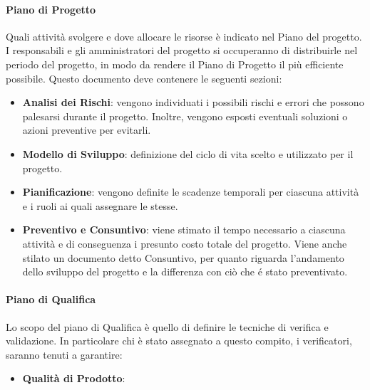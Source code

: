 \paragraph{Piano di Progetto}
Quali attività svolgere e dove allocare le risorse è indicato nel Piano del progetto. I responsabili e gli amministratori del progetto si occuperanno di distribuirle nel periodo del progetto, in modo da rendere il Piano di Progetto il più efficiente possibile. Questo documento deve contenere le seguenti sezioni:
\begin{itemize}
  \item \textbf{Analisi dei Rischi}: vengono individuati i possibili rischi e errori che possono palesarsi durante il progetto. Inoltre, vengono esposti eventuali soluzioni o azioni preventive per evitarli.
  \item \textbf{Modello di Sviluppo}: definizione del ciclo di vita scelto e utilizzato per il progetto.
  \item \textbf{Pianificazione}: vengono definite le scadenze temporali per ciascuna attività e i ruoli ai quali assegnare le stesse.
  \item \textbf{Preventivo e Consuntivo}: viene stimato il tempo necessario a ciascuna attività e di conseguenza i presunto costo totale del progetto. Viene anche stilato un documento detto Consuntivo, per quanto riguarda l'andamento dello sviluppo del progetto e la differenza con ciò che é stato preventivato.
\end{itemize}
\paragraph{Piano di Qualifica}
Lo scopo del piano di Qualifica è quello di definire le tecniche di verifica e validazione. In particolare chi è stato assegnato a questo compito, i verificatori, saranno tenuti a garantire:
\begin{itemize}
  \item \textbf{Qualità di Prodotto}:
\end{itemize}
